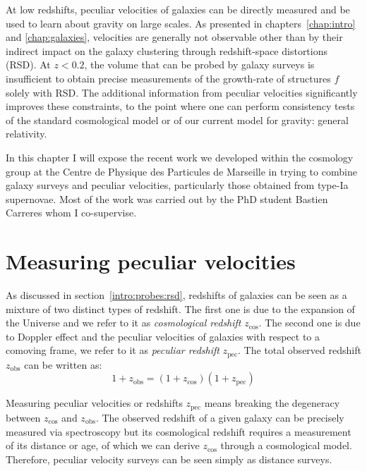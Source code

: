 At low redshifts, peculiar velocities of galaxies can be directly measured 
and be used to learn about gravity on large scales. 
As presented in chapters~\ref{chap:intro} and \ref{chap:galaxies}, velocities 
are generally not observable other than by their indirect impact on the 
galaxy clustering through redshift-space distortions (RSD).
At $z<0.2$, the volume that can be probed by galaxy surveys is insufficient to obtain 
precise measurements of the growth-rate of structures $f$ solely with RSD. 
The additional information from peculiar velocities
significantly improves these constraints, to the point where one 
can perform consistency tests of the standard cosmological model or of our current 
model for gravity: general relativity. 

In this chapter I will expose the recent work we developed within the 
cosmology group at the Centre de Physique des Particules de Marseille 
in trying to combine galaxy surveys and peculiar velocities, 
particularly those obtained from type-Ia supernovae. Most of the work 
was carried out by the PhD student Bastien Carreres whom I co-supervise. 




\section{Measuring peculiar velocities}
\label{velocities:measuring}

As discussed in section~\ref{intro:probes:rsd}, 
redshifts of galaxies can be seen as a mixture of two distinct types of redshift. 
The first one is due to the expansion of the Universe and we refer to it as 
\emph{cosmological redshift} $z_\text{cos}$. The second one is due to Doppler effect and the peculiar 
velocities of galaxies with respect to a comoving frame, we refer to it as \emph{peculiar redshift} $z_\text{pec}$.
The total observed redshift $z_\text{obs}$ can be written as: 
\begin{equation}
    1+ z_\text{obs} = (1+z_\text{cos})(1+z_\text{pec})
\end{equation}

Measuring peculiar velocities or redshifts $z_\text{pec}$ means 
breaking the degeneracy between $z_\text{cos}$ and $z_\text{obs}$. 
The observed redshift of a given galaxy can be precisely measured via spectroscopy 
but its cosmological redshift requires a measurement of its distance or age, 
of which we can derive $z_\text{cos}$ through a cosmological model.
Therefore, peculiar velocity surveys can be seen simply as distance surveys.

